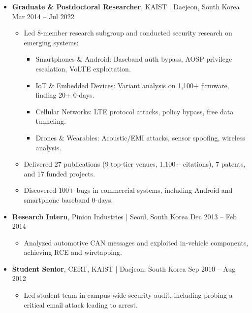 \documentclass[11pt,letterpaper]{article}
\newcommand{\jobtitle}[1]{\textbf{#1}}
\newcommand{\location}[1]{\textcolor{secondary}{\small #1}}
\newcommand{\daterange}[1]{\textcolor{secondary}{\small #1}}
\begin{document}
\begin{itemize}
\item \jobtitle{Graduate \& Postdoctoral Researcher}, \location{KAIST | Daejeon, South Korea} \hfill \daterange{Mar 2014 -- Jul 2022}
    \begin{itemize}[] %
    \item Led 8-member research subgroup and conducted security research on emerging systems:
        \begin{itemize}[]
        \item Smartphones \& Android: Baseband auth bypass, AOSP privilege escalation, VoLTE exploitation.
        \item IoT \& Embedded Devices: Variant analysis on 1,100+ firmware, finding 20+ 0-days.
        \item Cellular Networks: LTE protocol attacks, policy bypass, free data tunneling.
        \item Drones \& Wearables: Acoustic/EMI attacks, sensor spoofing, wireless analysis.
        \end{itemize}
    \item Delivered 27 publications (9 top-tier venues, 1,100+ citations), 7 patents, and 17 funded projects.
    \item Discovered 100+ bugs in commercial systems, including Android and smartphone baseband 0-days.
    \end{itemize}

\item \jobtitle{Research Intern}, \location{Pinion Industries | Seoul, South Korea} \hfill \daterange{Dec 2013 -- Feb 2014}
    \begin{itemize}[] %
    \item Analyzed automotive CAN messages and exploited in-vehicle components, achieving RCE and wiretapping.
    \end{itemize}

\item \jobtitle{Student Senior}, \location{CERT, KAIST | Daejeon, South Korea} \hfill \daterange{Sep 2010 -- Aug 2012}
    \begin{itemize}[] %
    \item Led student team in campus-wide security audit, including probing a critical email attack leading to arrest.
    \end{itemize}
\end{itemize}

\end{document}
